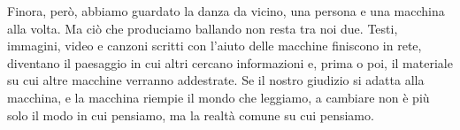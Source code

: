 Finora, però, abbiamo guardato la danza da vicino, una persona e una macchina alla volta. Ma ciò che produciamo ballando non resta tra noi due. Testi, immagini, video e canzoni scritti con l'aiuto delle macchine finiscono in rete, diventano il paesaggio in cui altri cercano informazioni e, prima o poi, il materiale su cui altre macchine verranno addestrate. Se il nostro giudizio si adatta alla macchina, e la macchina riempie il mondo che leggiamo, a cambiare non è più solo il modo in cui pensiamo, ma la realtà comune su cui pensiamo.
